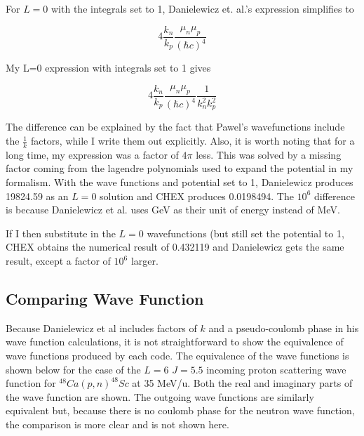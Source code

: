 \documentclass{article}
\begin{document}
For $L=0$ with the integrals set to 1, Danielewicz et. al.'s expression simplifies to

\begin{equation}
4\frac{k_n}{k_p} \frac{\mu_n \mu_p}{(\hbar c)^4} 
\end{equation}

My L=0 expression with integrals set to 1 gives

\begin{equation}
4\frac{k_n}{k_p} \frac{\mu_n \mu_p}{(\hbar c)^4} \frac{1}{k_n^2 k_p^2}
\end{equation}

The difference can be explained by the fact that Pawel's wavefunctions include the $\frac{1}{k}$ factors, while I write them out explicitly.  Also, it is worth noting that for a long time, my expression was a factor of $4\pi$ less.  This was solved by a missing factor coming from the lagendre polynomials used to expand the potential in my formalism.  With the wave functions and potential set to 1, Danielewicz produces 19824.59 as an $L=0$ solution and CHEX produces 0.0198494.  The $10^6$ difference is because Danielewicz et al. uses GeV as their unit of energy instead of MeV.  

If I then substitute in the $L=0$  wavefunctions (but still set the potential to 1, CHEX obtains the numerical result of 0.432119 and Danielewicz gets the same result, except a factor of $10^6$ larger.


\subsection{Comparing Wave Function}

Because Danielewicz et al includes factors of $k$ and a pseudo-coulomb phase in his wave function calculations, it is not straightforward to show the equivalence of wave functions produced by each code.  The equivalence of the wave functions is shown below for the case of the $L=6$ $J=5.5$ incoming proton scattering wave function for $^{48}Ca(p,n)^{48}Sc$ at 35 MeV/u.  Both the real and imaginary parts of the wave function are shown.  The outgoing wave functions are similarly equivalent but, because there is no coulomb phase for the neutron wave function, the comparison is more clear and is not shown here. 
\end{document}
